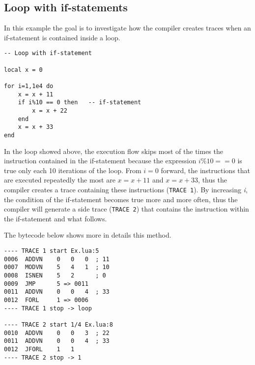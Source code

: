 \subsection{Loop with if-statements}
\label{subsec:if-statement}
In this example the goal is to investigate how the compiler creates traces when an if-statement is contained inside a loop.
\begin{mdframed}[style=LuaStyleFrame]
\begin{lstlisting}[style=LuaStyle]
-- Loop with if-statement

local x = 0

for i=1,1e4 do
	x = x + 11
	if i%10 == 0 then   -- if-statement
		x = x + 22
	end
	x = x + 33
end
\end{lstlisting}
\end{mdframed}
In the loop showed above, the execution flow skips most of the times the instruction contained in the if-statement because the expression $i\%10==0$ is true only each 10 iterations of the loop. From $i=0$ forward, the instructions that are executed repeatedly the most are $x=x+11$ and $x=x+33$, thus the compiler creates a trace containing these instructions (\texttt{TRACE 1}). By increasing \textit{i}, the condition of the if-statement becomes true more and more often, thus the compiler will generate a side trace (\texttt{TRACE 2}) that contains the instruction within the if-statement and what follows.
 
 
 \begin{comment}
and when the loop becomes hot, the compiler generates a trace (TRACE 1) that contains all the instructions in the loop, but the one inside the if-statement. This happens because this set of instruction is executed repeatedly.

Later on, every time that is \textit{i} is multiple of 10, the instruction inside the if-statement is executed. This means that the same exit from the root trace (TRACE 1) is taken more and more frequently. Then, when this happens for enough times (as said before the default threshold is 56) the compiler generate a side trace (TRACE 2). It should be noted that the side trace contains both the instruction inside the if-statement $x=x+22$ and the next instruction $x=x+33$. 
 \end{comment}
The bytecode below shows more in details this method.
\begin{multicols}{2}
\begin{lstlisting}[style=DumpStyle]
---- TRACE 1 start Ex.lua:5
0006  ADDVN    0   0   0  ; 11
0007  MODVN    5   4   1  ; 10
0008  ISNEN    5   2      ; 0
0009  JMP      5 => 0011
0011  ADDVN    0   0   4  ; 33
0012  FORL     1 => 0006
---- TRACE 1 stop -> loop

---- TRACE 2 start 1/4 Ex.lua:8
0010  ADDVN    0   0   3  ; 22
0011  ADDVN    0   0   4  ; 33
0012  JFORL    1   1
---- TRACE 2 stop -> 1
\end{lstlisting}
\end{multicols}

